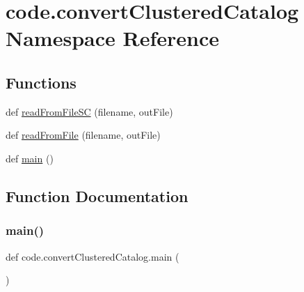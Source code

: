 \hypertarget{namespacecode_1_1convert_clustered_catalog}{}\section{code.\+convert\+Clustered\+Catalog Namespace Reference}
\label{namespacecode_1_1convert_clustered_catalog}
\subsection*{Functions}
\begin{DoxyCompactItemize}
\item 
def \hyperlink{namespacecode_1_1convert_clustered_catalog_aa6c67a730c50e4bb9316fa4d986abd06}{read\+From\+File\+SC} (filename, out\+File)
\item 
def \hyperlink{namespacecode_1_1convert_clustered_catalog_ac817689987811cc11db4b5340b6f2a2d}{read\+From\+File} (filename, out\+File)
\item 
def \hyperlink{namespacecode_1_1convert_clustered_catalog_a71534957785a78ae1b544ee8d301837e}{main} ()
\end{DoxyCompactItemize}


\subsection{Function Documentation}
\mbox{\label{namespacecode_1_1convert_clustered_catalog_a71534957785a78ae1b544ee8d301837e}} 
\subsubsection{\texorpdfstring{main()}{main()}}
{\footnotesize\ttfamily def code.\+convert\+Clustered\+Catalog.\+main (\begin{DoxyParamCaption}{ }\end{DoxyParamCaption})}

\mbox{\label{namespacecode_1_1convert_clustered_catalog_ac817689987811cc11db4b5340b6f2a2d}} 
